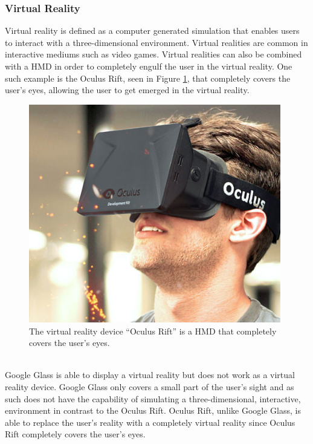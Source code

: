 \subsubsection{Virtual Reality}
\label{subsubsec:vr}
Virtual reality\cite{virtualRealityDef} is defined as a computer generated simulation that enables users to interact with a three-dimensional environment. Virtual realities are common in interactive mediums such as video games. Virtual realities can also be combined with a HMD in order to completely engulf the user in the virtual reality. One such example is the Oculus Rift, seen in Figure \ref{OculusRift}, that completely covers the user's eyes, allowing the user to get emerged in the virtual reality.
\\
	\begin{figure}[ht!]
		\centering
		\includegraphics[width=110mm]{images/OculusRift}
		\caption{The virtual reality device ``Oculus Rift'' is a HMD that completely covers the user's eyes.\cite{ImagesOculusRift}}
		\label{OculusRift}
	\end{figure}
\\
Google Glass is able to display a virtual reality but does not work as a virtual reality device. Google Glass only covers a small part of the user's sight and as such does not have the capability of simulating a three-dimensional, interactive, environment in contrast to the Oculus Rift. Oculus Rift, unlike Google Glass, is able to replace the user's reality with a completely virtual reality since Oculus Rift completely covers the user's eyes.

